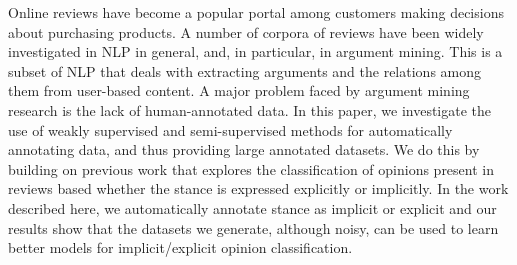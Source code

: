 Online reviews have become a popular portal among customers making decisions about purchasing products. A number of corpora of reviews have been widely investigated in NLP in general, and, in particular, in argument mining. This is a subset of NLP that deals with extracting arguments and the relations among them from user-based content. A major problem faced by argument mining research is the lack of human-annotated data. In this paper, we investigate the use of weakly supervised and semi-supervised methods for automatically annotating data, and thus providing large annotated datasets. We do this by building on previous work that explores the classification of opinions present in reviews based whether the stance is expressed explicitly or implicitly. In the work described here, we automatically annotate stance as implicit or explicit and our results show that the datasets we generate, although noisy, can be used to learn better models for implicit/explicit opinion classification.
